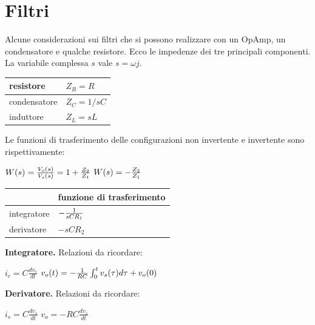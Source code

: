 \documentclass[a4paper,portrait,12pt]{article}
\theoremstyle{definition}
\begin{document}
\section{Filtri}
Alcune considerazioni sui filtri che si possono realizzare con un OpAmp, un condensatore e qualche resistore. 
Ecco le impedenze dei tre principali componenti. La variabile complessa $s$ vale $s = \omega j$.

\begin{table}[H]
\begin{center}
\begin{tabular}{|l|l|}
\hline resistore & $Z_R = R$\\
\hline condensatore & $Z_C = 1/sC$\\
\hline induttore & $Z_L = sL$\\
\hline
\end{tabular}
\end{center}
\end{table}

Le funzioni di trasferimento delle configurazioni non invertente e invertente sono rispettivamente:
\begin{center}
$W(s) = {V_o(s) \over V_s(s)} = 1 + {Z_2 \over Z_1}$ \qquad $W(s) = -{Z_2 \over Z_1}$
\end{center}

\begin{table}[H]
\begin{center}
\begin{tabular}{|l|l|}
\hline
\hline & funzione di trasferimento\\
\hline
\hline \rule[-4mm]{0mm}{1cm} integratore & $-{1 \over sCR_1}$\\
\hline derivatore & $-sCR_2$\\
\hline
\end{tabular}
\end{center}
\end{table}

\textbf{Integratore.} Relazioni da ricordare:
\begin{center}
$i_c = C\frac{dv_c}{ dt}$ \qquad $v_o(t) = -{1 \over RC}\int_0^tv_s(\tau)d\tau + v_o(0)$
\end{center}

\textbf{Derivatore.} Relazioni da ricordare:
\begin{center}
$i_s = C\frac{dv_s}{ dt}$ \qquad $v_o = -RC\frac{dv_s}{dt}$
\end{center}
\end{document}
